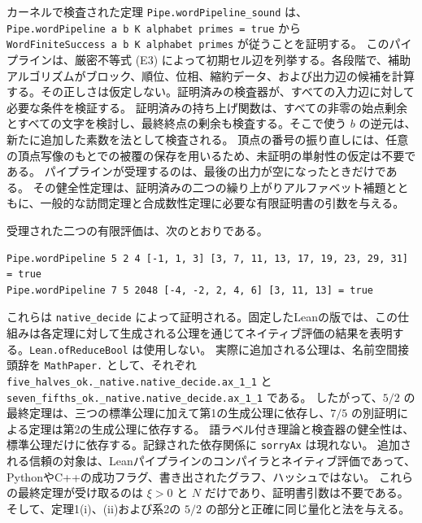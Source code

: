 \documentclass[11pt,reqno]{amsart}
\theoremstyle{definition}
\theoremstyle{definition}
\theoremstyle{remark}
\begin{document}
カーネルで検査された定理 \nolinkurl{Pipe.wordPipeline_sound} は、
\texttt{Pipe.wordPipeline\ a\ b\ K\ alphabet\ primes\ =\ true} から
\texttt{WordFiniteSuccess\ a\ b\ K\ alphabet\ primes} が従うことを証明する。
このパイプラインは、厳密不等式 (E3) によって初期セル辺を列挙する。各段階で、補助アルゴリズムがブロック、順位、位相、縮約データ、および出力辺の候補を計算する。その正しさは仮定しない。証明済みの検査器が、すべての入力辺に対して必要な条件を検証する。
証明済みの持ち上げ関数は、すべての非零の始点剰余とすべての文字を検討し、最終終点の剰余も検査する。そこで使う \(b\) の逆元は、新たに追加した素数を法として検査される。
頂点の番号の振り直しには、任意の頂点写像のもとでの被覆の保存を用いるため、未証明の単射性の仮定は不要である。
パイプラインが受理するのは、最後の出力が空になったときだけである。
その健全性定理は、証明済みの二つの繰り上がりアルファベット補題とともに、一般的な訪問定理と合成数性定理に必要な有限証明書の引数を与える。

受理された二つの有限評価は、次のとおりである。

\begin{Verbatim}[fontsize=\small,breaklines=true,breakanywhere=true]
Pipe.wordPipeline 5 2 4 [-1, 1, 3] [3, 7, 11, 13, 17, 19, 23, 29, 31] = true
Pipe.wordPipeline 7 5 2048 [-4, -2, 2, 4, 6] [3, 11, 13] = true
\end{Verbatim}

これらは \nolinkurl{native_decide} によって証明される。固定したLeanの版では、この仕組みは各定理に対して生成される公理を通じてネイティブ評価の結果を表明する。\texttt{Lean.ofReduceBool} は使用しない。
実際に追加される公理は、名前空間接頭辞を \texttt{MathPaper.} として、それぞれ
\nolinkurl{five_halves_ok._native.native_decide.ax_1_1} と
\nolinkurl{seven_fifths_ok._native.native_decide.ax_1_1}
である。
したがって、\(5/2\) の最終定理は、三つの標準公理に加えて第1の生成公理に依存し、\(7/5\) の別証明による定理は第2の生成公理に依存する。
語ラベル付き理論と検査器の健全性は、標準公理だけに依存する。記録された依存関係に \texttt{sorryAx} は現れない。
追加される信頼の対象は、Leanパイプラインのコンパイラとネイティブ評価であって、PythonやC++の成功フラグ、書き出されたグラフ、ハッシュではない。
これらの最終定理が受け取るのは \(\xi>0\) と \(N\) だけであり、証明書引数は不要である。そして、定理1(i)、(ii)および系2の \(5/2\) の部分と正確に同じ量化と法を与える。
\end{document}

